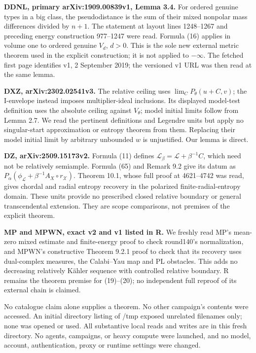 \documentclass[
  11pt,
]{article}
\begin{document}
\textbf{DDNL, primary arXiv:1909.00839v1, Lemma 3.4.} For ordered
genuine types in a big class, the pseudodistance is the sum of their
mixed nonpolar mass differences divided by \(n+1\). The statement at
layout lines 1248--1267 and preceding energy construction 977--1247 were
read. Formula (16) applies in volume one to ordered genuine \(V_d\),
\(d>0\). This is the sole new external metric theorem used in the
explicit construction; it is not applied to \(-\infty\). The fetched
first page identifies v1, 2 September 2019; the versioned v1 URL was
then read at the same lemma.

\textbf{DXZ, arXiv:2302.02541v3.} The relative ceiling uses
\(\lim_C P_\theta(u+C,v)\); the I-envelope instead imposes
multiplier-ideal inclusions. Its displayed model-test definition uses
the absolute ceiling against \(V_\theta\); model initial limits follow
from Lemma 2.7. We read the pertinent definitions and Legendre units but
apply no singular-start approximation or entropy theorem from them.
Replacing their model initial limit by arbitrary unbounded \(w\) is
unjustified. Our lemma is direct.

\textbf{DZ, arXiv:2509.15173v2.} Formula (11) defines
\(\mathcal L_\beta=\mathcal L+\beta^{-1}C\), which need not be
relatively semiample. Formula (65) and Remark 9.2 give its datum as
\(P_\alpha(\phi_\mathcal L+\beta^{-1}A_X\circ r_\mathcal X)\). Theorem
10.1, whose full proof at 4621--4742 was read, gives chordal and radial
entropy recovery in the polarized finite-radial-entropy domain. These
units provide no prescribed closed relative boundary or general
transcendental extension. They are scope comparisons, not premises of
the explicit theorem.

\textbf{MP and MPWN, exact v2 and v1 listed in R.} We freshly read MP's
mean-zero mixed estimate and finite-energy proof to check round140's
normalization, and MPWN's constructive Theorem 9.2.1 proof to check that
its recovery uses dual-complex measures, the Calabi--Yau map and PL
obstacles. This adds no decreasing relatively Kähler sequence with
controlled relative boundary. R remains the theorem premise for
(19)--(20); no independent full reproof of its external chain is
claimed.

No catalogue claim alone supplies a theorem. No other campaign's
contents were accessed. An initial directory listing of /tmp exposed
unrelated filenames only; none was opened or used. All substantive local
reads and writes are in this fresh directory. No agents, campaigns, or
heavy compute were launched, and no model, account, authentication,
proxy or runtime settings were changed.
\end{document}
